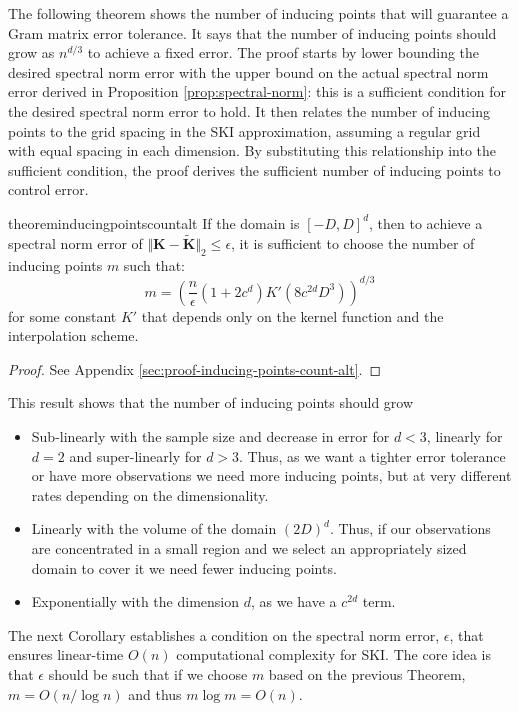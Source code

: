 The following theorem shows the number of inducing points that will guarantee a Gram matrix error tolerance. It says that the number of inducing points should grow as $n^{d/3}$ to achieve a fixed error. The proof starts by lower bounding the desired spectral norm error with the upper bound on the actual spectral norm error derived in Proposition \ref{prop:spectral-norm}: this is a sufficient condition for the desired spectral norm error to hold. It then relates the number of inducing points to the grid spacing in the SKI approximation, assuming a regular grid with equal spacing in each dimension. By substituting this relationship into the sufficient condition, the proof derives the sufficient number of inducing points to control error. 

\begin{restatable}{theorem}{inducingpointscountalt}\label{thm:inducing-points-count-alt}
    If the domain is $[-D, D]^d$, then to achieve a spectral norm error of $\Vert \textbf{K} - \tilde{\textbf{K}} \Vert_2 \leq \epsilon$, it is sufficient to choose the number of inducing points $m$ such that:
    $$
    m = \left( \frac{n}{\epsilon} (1 + 2c^d) K' (8 c^{2d} D^3) \right)^{d/3}
    $$
    for some constant $K'$ that depends only on the kernel function and the interpolation scheme.
\end{restatable}
\begin{proof}
    See Appendix \ref{sec:proof-inducing-points-count-alt}.
\end{proof}
This result shows that the number of inducing points should grow
\begin{itemize}
\item Sub-linearly with the sample size and decrease in error for $d<3$, linearly for $d=2$ and super-linearly for $d>3$. Thus, as we want a tighter error tolerance or have more observations we need more inducing points, but at very different rates depending on the dimensionality.
\item Linearly with the volume of the domain $(2D)^d$. Thus, if our observations are concentrated in a small region and we select an appropriately sized domain to cover it we need fewer inducing points.
\item Exponentially with the dimension $d$, as we have a $c^{2d}$ term.
\end{itemize}

The next Corollary establishes a condition on the spectral norm error, $\epsilon$, that ensures linear-time $O(n)$ computational complexity for SKI. The core idea is that $\epsilon$ should be such that if we choose $m$ based on the previous Theorem, $m=O(n/\log n)$ and thus $m\log m=O(n)$. 
    
